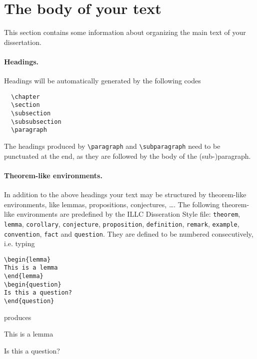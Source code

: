 \section{The body of your text}
This section contains some information about organizing the main
text of your dissertation.

\paragraph*{Headings.}
Headings will be automatically generated by the following codes
\begin{verbatim}
  \chapter
  \section
  \subsection
  \subsubsection
  \paragraph
\end{verbatim}
The headings produced by \verb|\paragraph| and \verb|\subparagraph| 
need to be punctuated at the end,
as they are followed by the body of the (sub-)paragraph.

\paragraph*{Theorem-like environments.}
In addition to the above headings your text may be structured 
by theorem-like environments, like lemmas, propositions, conjectures, \ldots .
The following theorem-like environments are predefined by the ILLC Disseration 
Style file: \verb|theorem|, \verb|lemma|, \verb|corollary|, \verb|conjecture|, 
\verb|proposition|, \verb|definition|, \verb|remark|, 
\verb|example|, \verb|convention|, \verb|fact| and \verb|question|.
They are defined to be numbered consecutively, i.e. typing
\begin{verbatim}
\begin{lemma}
This is a lemma
\end{lemma}
\begin{question}
Is this a question?
\end{question}
\end{verbatim}
produces
\begin{lemma}
This is a lemma
\end{lemma}
\begin{question}
Is this a question?
\end{question}

